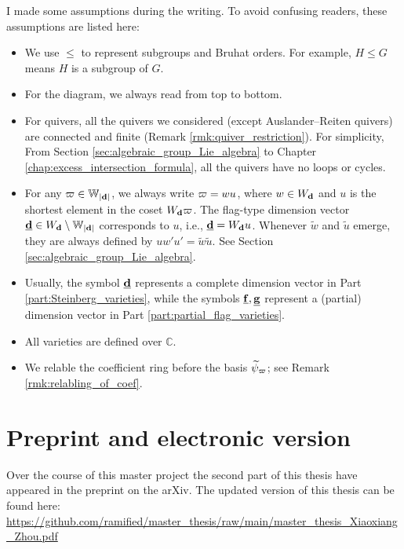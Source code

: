 \begin{warning}
I made some assumptions during the writing. To avoid confusing readers, these assumptions are listed here:
\begingroup
{}
\begin{itemize}
\item We use $\leqslant$ to represent subgroups and Bruhat orders. For example, $H \leqslant G$ means $H$ is a subgroup of $G$.

\item For the diagram, we always read from top to bottom.



\item For quivers, all the quivers we considered (except Auslander--Reiten quivers) are connected and finite (Remark \ref{rmk:quiver_restriction}). For simplicity, From Section \ref{sec:algebraic_group_Lie_algebra} to Chapter \ref{chap:excess_intersection_formula}, all the quivers have no loops or cycles.

\item  For any $\varpi \in \mathbb{W}_{|\mathbf{d}|}$, we always write $\varpi = wu$, where $w \in W_{\mathbf{d}}$ and $u$ is the shortest element in the coset $W_{\mathbf{d}} \varpi$. The flag-type dimension vector $\underline{\mathbf{d}} \in W_{\mathbf{d}} \setminus \mathbb{W}_{|\mathbf{d}|}$ corresponds to $u$, i.e., $\underline{\mathbf{d}}=W_{\mathbf{d}} u$. Whenever $\tilde{w}$ and $\tilde{u}$ emerge, they are always defined by $uw'u'=\tilde{w}\tilde{u}$. See Section \ref{sec:algebraic_group_Lie_algebra}. 

\item Usually, the symbol $\underline{\mathbf{d}}$ represents a complete   dimension vector in Part \ref{part:Steinberg_varieties}, while the symbols $\underline{\mathbf{f}}, \underline{\mathbf{g}}$ represent a (partial) dimension vector in Part \ref{part:partial_flag_varieties}.

\item All varieties are defined over $\mathbb{C}$. 

\item We relable the coefficient ring before the basis $\widetilde{\psi}_{\varpi}$; see Remark \ref{rmk:relabling_of_coef}.
\end{itemize}
\endgroup
\end{warning}

\section*{Preprint and electronic version}
Over the course of this master project the second part of this thesis have appeared in the preprint \cite{zhou2022affine} on the arXiv. The updated version of this thesis can be found here:  \href{https://github.com/ramified/master_thesis/raw/main/master_thesis_Xiaoxiang_Zhou.pdf}{https://github.com/ramified/master\_thesis/raw/main/master\_thesis\_Xiaoxiang\_Zhou.pdf}